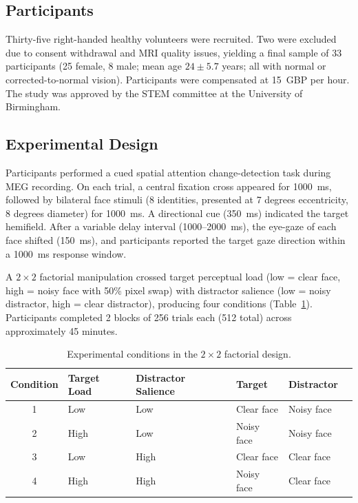 \documentclass[12pt]{article}
\begin{document}
\subsection{Participants}

Thirty-five right-handed healthy volunteers were recruited. Two were excluded due to consent withdrawal and MRI quality issues, yielding a final sample of 33 participants (25 female, 8 male; mean age $24 \pm 5.7$ years; all with normal or corrected-to-normal vision). Participants were compensated at 15~GBP per hour. The study was approved by the STEM committee at the University of Birmingham.

\subsection{Experimental Design}

Participants performed a cued spatial attention change-detection task during MEG recording. On each trial, a central fixation cross appeared for 1000~ms, followed by bilateral face stimuli (8 identities, presented at 7 degrees eccentricity, 8 degrees diameter) for 1000~ms. A directional cue (350~ms) indicated the target hemifield. After a variable delay interval (1000--2000~ms), the eye-gaze of each face shifted (150~ms), and participants reported the target gaze direction within a 1000~ms response window.

A $2 \times 2$ factorial manipulation crossed target perceptual load (low = clear face, high = noisy face with 50\% pixel swap) with distractor salience (low = noisy distractor, high = clear distractor), producing four conditions (Table~\ref{tab:conditions}). Participants completed 2 blocks of 256 trials each (512 total) across approximately 45 minutes.

\begin{table}[ht]
\centering
\caption{Experimental conditions in the $2 \times 2$ factorial design.}
\label{tab:conditions}
\begin{tabular}{clllll}
\toprule
Condition & Target Load & Distractor Salience & Target & Distractor \\
\midrule
1 & Low & Low & Clear face & Noisy face \\
2 & High & Low & Noisy face & Noisy face \\
3 & Low & High & Clear face & Clear face \\
4 & High & High & Noisy face & Clear face \\
\bottomrule
\end{tabular}
\end{table}
\end{document}
